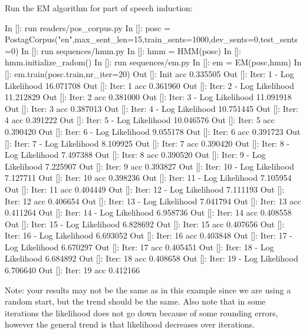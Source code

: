 \begin{exercise}
Run the EM algorithm for part of speech induction:
\begin{python}
In []: run readers/pos_corpus.py
In []: posc = PostagCorpus("en",max_sent_len=15,train_sents=1000,dev_sents=0,test_sents=0)
In []: run sequences/hmm.py
In []: hmm = HMM(posc)
In []: hmm.initialize_radom()
In []: run sequences/em.py
In []: em = EM(posc,hmm)
In []: em.train(posc.train,nr_iter=20)
Out []: Init acc 0.335505
Out []: Iter: 1 - Log Likelihood 16.071708
Out []: Iter: 1 acc 0.361960
Out []: Iter: 2 - Log Likelihood 11.212829
Out []: Iter: 2 acc 0.381000
Out []: Iter: 3 - Log Likelihood 11.091918
Out []: Iter: 3 acc 0.387013
Out []: Iter: 4 - Log Likelihood 10.751445
Out []: Iter: 4 acc 0.391222
Out []: Iter: 5 - Log Likelihood 10.046576
Out []: Iter: 5 acc 0.390420
Out []: Iter: 6 - Log Likelihood 9.055178
Out []: Iter: 6 acc 0.391723
Out []: Iter: 7 - Log Likelihood 8.109925
Out []: Iter: 7 acc 0.390420
Out []: Iter: 8 - Log Likelihood 7.497388
Out []: Iter: 8 acc 0.390520
Out []: Iter: 9 - Log Likelihood 7.225907
Out []: Iter: 9 acc 0.393827
Out []: Iter: 10 - Log Likelihood 7.127711
Out []: Iter: 10 acc 0.398236
Out []: Iter: 11 - Log Likelihood 7.105954
Out []: Iter: 11 acc 0.404449
Out []: Iter: 12 - Log Likelihood 7.111193
Out []: Iter: 12 acc 0.406654
Out []: Iter: 13 - Log Likelihood 7.041794
Out []: Iter: 13 acc 0.411264
Out []: Iter: 14 - Log Likelihood 6.958736
Out []: Iter: 14 acc 0.408558
Out []: Iter: 15 - Log Likelihood 6.828692
Out []: Iter: 15 acc 0.407656
Out []: Iter: 16 - Log Likelihood 6.693052
Out []: Iter: 16 acc 0.403848
Out []: Iter: 17 - Log Likelihood 6.670297
Out []: Iter: 17 acc 0.405451
Out []: Iter: 18 - Log Likelihood 6.684892
Out []: Iter: 18 acc 0.408658
Out []: Iter: 19 - Log Likelihood 6.706640
Out []: Iter: 19 acc 0.412166
\end{python}
Note: your results may not be the same as in this example since we are using a random start, but the trend should be the same. Also note that in some iterations the likelihood does not go down because of some rounding errors, however the general trend is that likelihood decreases over iterations. 
\end{exercise}

